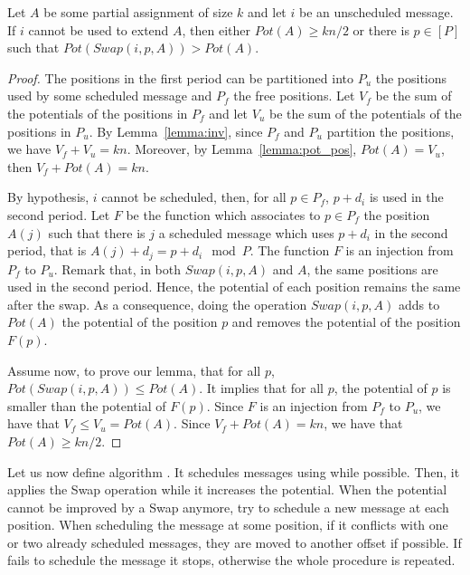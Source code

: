 \documentclass[pdflatex,sn-mathphys,iicol]{sn-jnl}%
\theoremstyle{thmstyleone}%
\theoremstyle{thmstyletwo}%
\theoremstyle{thmstylethree}%
\begin{document}
\begin{lemma}\label{lemma:swap}
Let $A$ be some partial assignment of size $k$ and let $i$ be an unscheduled message. If $i$ cannot be used to extend $A$, then either $Pot(A) \geq kn/2$ or there is $p \in [P]$ such that $Pot(Swap(i,p,A)) > Pot(A)$.
\end{lemma}

\begin{proof}
The positions in the first period can be partitioned into $P_{u}$ the positions used by some scheduled message and $P_{f}$ the free positions.
Let $V_f$ be the sum of the potentials of the positions in $P_f$ and let $V_u$ be the sum of the potentials of the positions in $P_u$. By Lemma~\ref{lemma:inv}, since $P_f$ and $P_u$ partition the positions, we have $V_f + V_u = kn$. Moreover, by Lemma~\ref{lemma:pot_pos}, $Pot(A) = V_u$, then $V_f + Pot(A) = kn$.

By hypothesis, $i$ cannot be scheduled, then, for all $p \in P_{f}$, $p+d_i$ is used in the second period. Let $F$ be the function which associates to $p \in P_{f}$ the position $A(j)$ such that there is $j$ a scheduled message which uses $p+d_i$ in the second period, that is $A(j) + d_j = p + d_i \mod P$. The function $F$ is an injection from $P_{f}$ to $P_u$. Remark that, in both $Swap(i,p,A)$ and $A$, the same positions are used in the second period. Hence, the potential of each position remains the same after the swap. As a consequence, doing the operation $Swap(i,p,A)$ adds to $Pot(A)$ the potential of the position $p$ and removes the potential of the position $F(p)$. 

Assume now, to prove our lemma, that for all $p$, $Pot(Swap(i,p,A)) \leq Pot(A)$. It implies that for all $p$, the potential of $p$ is smaller than the potential of $F(p)$. Since $F$ is an injection from $P_f$ to $P_u$, we have that $V_f \leq V_u = Pot(A)$. Since $V_f + Pot(A) = kn$, we have that $Pot(A) \geq kn/2$.
\end{proof}

Let us now define algorithm \swapandmove. 
It schedules messages using \firstfit while possible. Then, it applies the Swap operation while it increases the potential. When the potential cannot be improved by a Swap anymore, \swapandmove try to schedule a new message at each position. When scheduling the message at some position, if it conflicts with one or two already scheduled messages, they are moved to another offset if possible. If \swapandmove fails to schedule the message it stops, otherwise the whole procedure is repeated. 
\end{document}
